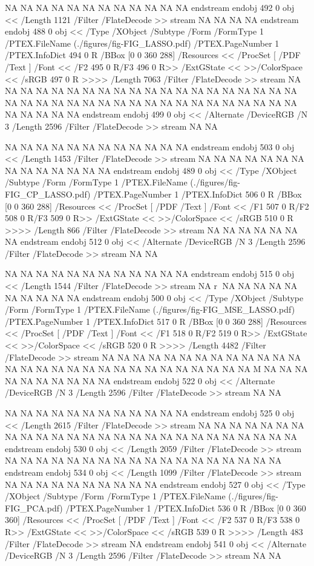 {NA
NA
NA
NA
NA
NA
NA
NA
NA
NA
NA
NA
endstream
endobj
492 0 obj <<
/Length 1121      
/Filter /FlateDecode
>>
stream
NA
NA
NA
NA
endstream
endobj
488 0 obj <<
/Type /XObject
/Subtype /Form
/FormType 1
/PTEX.FileName (./figures/fig-FIG_LASSO.pdf)
/PTEX.PageNumber 1
/PTEX.InfoDict 494 0 R
/BBox [0 0 360 288]
/Resources <<
/ProcSet [ /PDF /Text ]
/Font << /F2 495 0 R/F3 496 0 R>>
/ExtGState <<
>>/ColorSpace <<
/sRGB 497 0 R
>>>>
/Length 7063
/Filter /FlateDecode
>>
stream
NA
NA
NA
NA
NA
NA
NA
NA
NA
NA
NA
NA
NA
NA
NA
NA
NA
NA
NA
NA
NA
NA
NA
NA
NA
NA
NA
NA
NA
NA
NA
NA
NA
NA
NA
NA
NA
NA
NA
NA
NA
NA
NA
NA
endstream
endobj
499 0 obj
<<
/Alternate /DeviceRGB
/N 3
/Length 2596
/Filter /FlateDecode
>>
stream
NA
NA

NA
NA
NA
NA
NA
NA
NA
NA
NA
NA
NA
NA
endstream
endobj
503 0 obj <<
/Length 1453      
/Filter /FlateDecode
>>
stream
NA
NA
NA
NA
NA
NA
NA
NA
NA
NA
NA
NA
NA
NA
endstream
endobj
489 0 obj <<
/Type /XObject
/Subtype /Form
/FormType 1
/PTEX.FileName (./figures/fig-FIG_CP_LASSO.pdf)
/PTEX.PageNumber 1
/PTEX.InfoDict 506 0 R
/BBox [0 0 360 288]
/Resources <<
/ProcSet [ /PDF /Text ]
/Font << /F1 507 0 R/F2 508 0 R/F3 509 0 R>>
/ExtGState <<
>>/ColorSpace <<
/sRGB 510 0 R
>>>>
/Length 866
/Filter /FlateDecode
>>
stream
NA
NA
NA
NA
NA
NA
NA
endstream
endobj
512 0 obj
<<
/Alternate /DeviceRGB
/N 3
/Length 2596
/Filter /FlateDecode
>>
stream
NA
NA

NA
NA
NA
NA
NA
NA
NA
NA
NA
NA
NA
NA
endstream
endobj
515 0 obj <<
/Length 1544      
/Filter /FlateDecode
>>
stream
NA
r
NA
NA
NA
NA
NA
NA
NA
NA
NA
NA
endstream
endobj
500 0 obj <<
/Type /XObject
/Subtype /Form
/FormType 1
/PTEX.FileName (./figures/fig-FIG_MSE_LASSO.pdf)
/PTEX.PageNumber 1
/PTEX.InfoDict 517 0 R
/BBox [0 0 360 288]
/Resources <<
/ProcSet [ /PDF /Text ]
/Font << /F1 518 0 R/F2 519 0 R>>
/ExtGState <<
>>/ColorSpace <<
/sRGB 520 0 R
>>>>
/Length 4482
/Filter /FlateDecode
>>
stream
NA
NA
NA
NA
NA
NA
NA
NA
NA
NA
NA
NA
NA
NA
NA
NA
NA
NA
NA
NA
NA
NA
NA
NA
NA
NA
NA
NA
NA
M
NA
NA
NA
NA
NA
NA
NA
NA
NA
NA
endstream
endobj
522 0 obj
<<
/Alternate /DeviceRGB
/N 3
/Length 2596
/Filter /FlateDecode
>>
stream
NA
NA

NA
NA
NA
NA
NA
NA
NA
NA
NA
NA
NA
NA
endstream
endobj
525 0 obj <<
/Length 2615      
/Filter /FlateDecode
>>
stream
NA
NA
NA
NA
NA
NA
NA
NA
NA
NA
NA
NA
NA
NA
NA
NA
NA
NA
NA
NA
NA
NA
NA
NA
NA
NA
endstream
endobj
530 0 obj <<
/Length 2059      
/Filter /FlateDecode
>>
stream
NA
NA
NA
NA
NA
NA
NA
NA
NA
NA
NA
NA
NA
NA
NA
NA
NA
NA
endstream
endobj
534 0 obj <<
/Length 1099      
/Filter /FlateDecode
>>
stream
NA
NA
NA
NA
NA
NA
NA
NA
NA
NA
endstream
endobj
527 0 obj <<
/Type /XObject
/Subtype /Form
/FormType 1
/PTEX.FileName (./figures/fig-FIG_PCA.pdf)
/PTEX.PageNumber 1
/PTEX.InfoDict 536 0 R
/BBox [0 0 360 360]
/Resources <<
/ProcSet [ /PDF /Text ]
/Font << /F2 537 0 R/F3 538 0 R>>
/ExtGState <<
>>/ColorSpace <<
/sRGB 539 0 R
>>>>
/Length 483
/Filter /FlateDecode
>>
stream
NA
endstream
endobj
541 0 obj
<<
/Alternate /DeviceRGB
/N 3
/Length 2596
/Filter /FlateDecode
>>
stream
NA
NA

}
